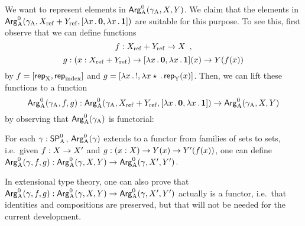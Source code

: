\documentclass{article}
\begin{document}
We want to represent elements in $\mathsf{Arg}^{0}_{\mathrm{A}}(\gamma_{\mathrm{A}}, X, Y)$. We claim that
the elements in $\mathsf{Arg}^{0}_{\mathrm{A}}(\gamma_{\mathrm{A}}, X_{\mathrm{ref}} + Y_{\mathrm{ref}}, [\lambda x\,.\,\mathbf{0},
\lambda x\,.\,\mathbf{1}])$ are suitable for this purpose. To see this,
first observe that we can define functions
\[
f : X_{\mathrm{ref}} + Y_{\mathrm{ref}} \to X \enspace ,
\]
%
%
\[
g : (x : X_{\mathrm{ref}} + Y_{\mathrm{ref}}) \to
    [\lambda x\,.\,\mathbf{0}, \lambda x\,.\,\mathbf{1}](x)
      \to Y(f(x))
\]
%
by $f = [\mathsf{rep}_{\mathrm{X}}, \mathsf{rep}_{\mathrm{index}}]$ and $g = [\lambda x\,.\,!, \lambda x \star\,.\, \mathsf{rep}_{\mathrm{Y}}(x)]$. Then, we can lift these
functions to a function
%
\[
\mathsf{Arg}^{0}_{\mathrm{A}}(\gamma_{\mathrm{A}}, f, g) : \mathsf{Arg}^{0}_{\mathrm{A}}(\gamma_{\mathrm{A}}, X_{\mathrm{ref}} +Y_{\mathrm{ref}}, [\lambda x\,.\,\mathbf{0}, \lambda x\,.\,\mathbf{1}]) \to
                       \mathsf{Arg}^{0}_{\mathrm{A}}(\gamma_{\mathrm{A}}, X, Y)
\]
%
by observing that $\mathsf{Arg}^{0}_{\mathrm{A}}(\gamma_{\mathrm{A}})$ is functorial:

\begin{lemma} %
  For each $\gamma : \mathsf{SP}^{0}_{\mathrm{A}}$, $\mathsf{Arg}^{0}_{\mathrm{A}}(\gamma)$ extends to a functor from
  families of sets to sets, i.e.\ given $f : X \to X'$ and $g : (x :
  X) \to Y(x) \to Y'(f(x))$, one can define $\mathsf{Arg}^{0}_{\mathrm{A}}(\gamma, f, g) :
  \mathsf{Arg}^{0}_{\mathrm{A}}(\gamma, X, Y) \to \mathsf{Arg}^{0}_{\mathrm{A}}(\gamma, X', Y')$.
\end{lemma}
\begin{remark}
  In extensional type theory, one can also prove that $\mathsf{Arg}^{0}_{\mathrm{A}}(\gamma,
  f, g) : \mathsf{Arg}^{0}_{\mathrm{A}}(\gamma, X, Y) \to \mathsf{Arg}^{0}_{\mathrm{A}}(\gamma, X', Y')$
  actually is a functor, i.e.\ that identities and compositions are
  preserved, but that will not be needed for the current development.
\end{remark}
\end{document}
